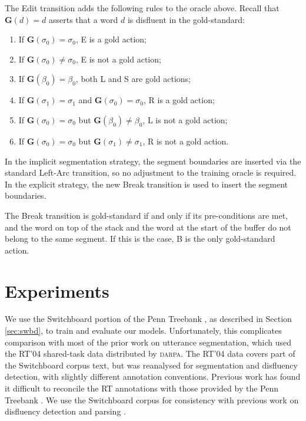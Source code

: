 \documentclass[11pt,letterpaper]{article}
\begin{document}
\noindent The \citet{honnibal:14} Edit transition adds the following rules to the oracle
above. Recall that $\mathbf{G}(d)=d$ asserts that a word $d$ is disfluent in the
gold-standard:

\begin{enumerate}
    \item If $\mathbf{G}(\sigma_0) = \sigma_0$, E is a gold action;
    \item If $\mathbf{G}(\sigma_0) \not= \sigma_0$, E is not a gold action;
    \item If $\mathbf{G}(\beta_0) = \beta_0$, both L and S are gold actions;
    \item If $\mathbf{G}(\sigma_1)= \sigma_1$ and $\mathbf{G}(\sigma_0) = \sigma_0$, R
        is a gold action;
    \item If $\mathbf{G}(\sigma_0) = \sigma_0$ but $\mathbf{G}(\beta_0) \not= \beta_0$,
          L is not a gold action;
      \item If $\mathbf{G}(\sigma_0) = \sigma_0$ but $\mathbf{G}(\sigma_1) \not= \sigma_1$,
          R is not a gold action.
\end{enumerate}

\noindent In the implicit segmentation strategy, the segment boundaries are inserted
via the standard Left-Arc transition, so no adjustment to the training oracle
is required.  In the explicit strategy, the new Break transition is used to insert the
segment boundaries. 

The Break transition is gold-standard if and only if its pre-conditions
are met, and the word on top of the stack and the word at the start of the buffer
do not belong to the same segment.  If this is the case, B is the only gold-standard
action.

\section{Experiments}

We use the Switchboard portion of the Penn Treebank \citep{marcus:93}, as
described in Section \ref{sec:swbd}, to train and evaluate our models.  Unfortunately,
this complicates comparison with most of the prior work on utterance segmentation,
which used the RT'04 shared-task data distributed by \textsc{darpa}.
The RT'04 data covers part of the Switchboard corpus text, but was reanalysed
for segmentation and disfluency detection, with slightly different annotation
conventions.  Previous work has found it difficult to reconcile the RT annotations
with those provided by the Penn Treebank \citep{bies:06}.
We use
the Switchboard corpus for consistency with previous work on disfluency 
detection and parsing \citep{qian:13,rasooli:13,honnibal:14}.
\end{document}
